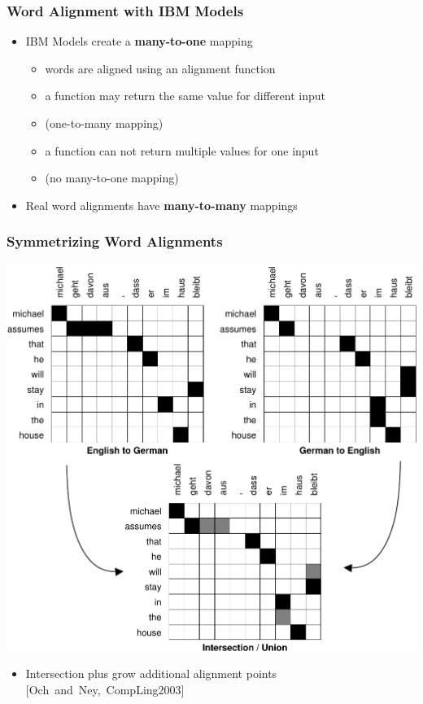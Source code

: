 \begin{frame}
\frametitle{Word Alignment with IBM Models\koehnref}

\begin{itemize}
\item IBM Models create a {\bf many-to-one} mapping
{\begin{itemize}\itemsep 3mm
\item words are aligned using an alignment function
\item a function may return the same value for different input
\item[]  (one-to-many mapping)
\item a function can not return multiple values for one input
\item[]  (no many-to-one mapping)
\end{itemize} }
\item  Real word alignments have {\bf many-to-many} mappings
\end{itemize}

\end{frame}


\begin{frame}
\frametitle{Symmetrizing Word Alignments\koehnref}
\vspace{-5mm}
\begin{center} 
\includegraphics[scale=0.45]{figures/michael-bidirectional.pdf}
\end{center}
\begin{itemize}
\item Intersection plus grow additional alignment points [Och~and~Ney,~CompLing2003]
\end{itemize}

\end{frame}


